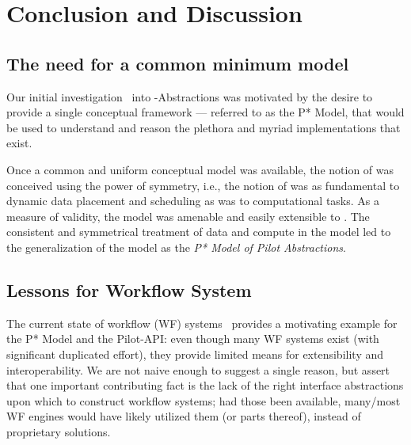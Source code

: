 \documentclass{sig-alternate}
\begin{document}



\section{Conclusion and Discussion}

\subsection{The need for a common minimum model}


Our initial investigation~\cite{Luckow:2008la} into
\pilot-Abstractions was motivated by the desire to provide a single
conceptual framework --- referred to as the P* Model, that would be
used to understand and reason the plethora and myriad \pilotjob
implementations that exist.

 
Once a common and uniform conceptual model was available, the notion
of \pilotdata was conceived using the power of symmetry, i.e., the
notion of \pilotdata was as fundamental to dynamic data placement and
scheduling as \pilotjobs was to computational tasks. As a measure of
validity, the \pstar model was amenable and easily extensible to
\pilotdata.  The consistent and symmetrical treatment of data and
compute in the model led to the generalization of the model as the
{\it P* Model of Pilot Abstractions}.


\subsection{Lessons for Workflow System}

The current state of workflow (WF) systems~\cite{nsf-workflow,1196459}
provides a motivating example for the P* Model and the Pilot-API: even
though many WF systems exist (with significant duplicated effort),
they provide limited means for extensibility and interoperability.  We
are not naive enough to suggest a single reason, but assert that one
important contributing fact is the lack of the right interface
abstractions upon which to construct workflow systems; had those been
available, many/most WF engines would have likely utilized them (or
parts thereof), instead of proprietary solutions.
\end{document}
